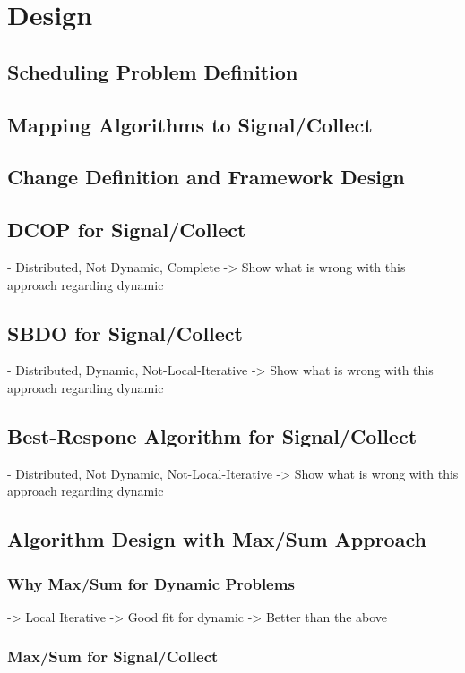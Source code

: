 \chapter{Design}
\section{Scheduling Problem Definition}
\section{Mapping Algorithms to Signal/Collect}
\section{Change Definition and Framework Design}
\section{DCOP for Signal/Collect}

- Distributed, Not Dynamic, Complete -> Show what is wrong with this approach regarding dynamic

\section{SBDO for Signal/Collect}

- Distributed, Dynamic, Not-Local-Iterative -> Show what is wrong with this approach regarding dynamic

\section{Best-Respone Algorithm for Signal/Collect}

- Distributed, Not Dynamic, Not-Local-Iterative -> Show what is wrong with this approach regarding dynamic

\section{Algorithm Design with Max/Sum Approach}
\subsection{Why Max/Sum for Dynamic Problems}
-> Local Iterative
-> Good fit for dynamic
-> Better than the above
\subsection{Max/Sum for Signal/Collect}

